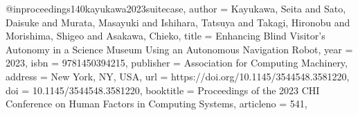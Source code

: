 @inproceedings{140kayukawa2023suitecase,
author = {Kayukawa, Seita and Sato, Daisuke and Murata, Masayuki and Ishihara, Tatsuya and Takagi, Hironobu and Morishima, Shigeo and Asakawa, Chieko},
title = {Enhancing Blind Visitor’s Autonomy in a Science Museum Using an Autonomous Navigation Robot},
year = {2023},
isbn = {9781450394215},
publisher = {Association for Computing Machinery},
address = {New York, NY, USA},
url = {https://doi.org/10.1145/3544548.3581220},
doi = {10.1145/3544548.3581220},
booktitle = {Proceedings of the 2023 CHI Conference on Human Factors in Computing Systems},
articleno = {541},
}